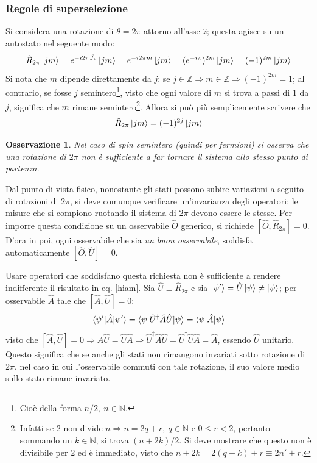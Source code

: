 \documentclass[11pt, a4paper]{scrartcl} %
\numberwithin{equation}{subsection}
\theoremstyle{style2}
\newtheorem{osservazione}{Osservazione}[section]
\theoremstyle{style1}
\begin{document}
\subsubsection{Regole di superselezione}
Si considera una rotazione di $\theta  = 2\pi$ attorno all'asse $\hat{z}$; questa agisce su un autostato nel seguente modo:
\[
	\hat{R}_{2\pi}\ket{jm} = e^{-i 2\pi \hat{J}_z} \ket{jm} = e^{-i 2\pi m} \ket{jm} = (e^{-i\pi} ) ^{2m} \ket{jm} =(-1)^{2m} \ket{j m} 
\] 
Si nota che $m$ dipende direttamente da $j$: se $j \in \mathbb{Z}\Rightarrow m \in \mathbb{Z} \Rightarrow (-1)^{2m} = 1$; 
al contrario, se fosse $j$ semintero\footnote{Cio\`e della forma $n / 2, \ n \in \mathbb{N}$.}, visto che ogni valore di $m$ si trova a passi di $1$ da $j$, significa che $m$ rimane semintero\footnote{Infatti se $2$ non divide $n\Rightarrow n = 2q + r, \ q \in \mathbb{N}$ e $0\le  r< 2$, pertanto sommando un $k\in \mathbb{N}$, si trova $(n+2k) / 2$. Si deve mostrare che questo non \`e divisibile per $2$ ed \`e immediato, visto che $n + 2k = 2(q+k) + r \equiv 2n' + r$.}. 
Allora si pu\`o pi\`u semplicemente scrivere che
\begin{equation}\label{hiam}
	\hat{R}_{2\pi} \ket{jm} = (-1)^{2j} \ket{jm} 
\end{equation}
\begin{osservazione}
Nel caso di spin semintero (quindi per fermioni) si osserva che una rotazione di $2\pi$ non \`e sufficiente a far tornare il sistema allo stesso punto di partenza.
\end{osservazione}
Dal punto di vista fisico, nonostante gli stati possono subire variazioni a seguito di rotazioni di $2\pi$, si deve comunque verificare un'invarianza degli operatori: le misure che si compiono ruotando il sistema di $2\pi$ devono essere le stesse.
Per imporre questa condizione su un osservabile $\hat{O}$ generico, si richiede $\left[ \hat{O}, \hat{R}_{2\pi}  \right] = 0 $.
D'ora in poi, ogni osservabile che sia \textit{un buon osservabile}, soddisfa automaticamente $\left[ \hat{O}, \hat{U} \right] =0$.

Usare operatori che soddisfano questa richiesta non \`e sufficiente a rendere indifferente il risultato in eq. \ref{hiam}.
Sia $\hat{U}\equiv \hat{R}_{2\pi} $ e sia $\ket{\psi '} = \hat{U}\ket{\psi } \neq \ket{\psi } $; per osservabile $\hat{A}$ tale che $\left[ \hat{A},\hat{U} \right] =0$:
\[
\braket{\psi '|\hat{A}|\psi '} = \braket{\psi |\hat{U}^\dagger \hat{A}\hat{U}|\psi } = \braket{\psi |\hat{A}|\psi } 
\] 
visto che $\left[ \hat{A}, \hat{U} \right]=0 \Rightarrow \hat{A}\hat{U}= \hat{U}\hat{A}\Rightarrow \hat{U}^\dagger \hat{A}\hat{U}= \hat{U}^\dagger \hat{U}\hat{A}= \hat{A}$, essendo $\hat{U}$ unitario.
Questo significa che se anche gli stati non rimangono invariati sotto rotazione di $2\pi$, nel caso in cui l'osservabile commuti con tale rotazione, il suo valore medio sullo stato rimane invariato.
\end{document}
